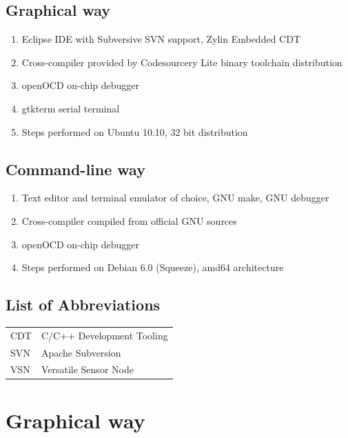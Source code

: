 \documentclass[a4paper, 10pt]{article}
\begin{document}
\subsection{Graphical way}

\begin{enumerate}
\item Eclipse IDE with Subversive SVN support, Zylin Embedded CDT
\item Cross-compiler provided by Codesourcery Lite binary toolchain
distribution
\item openOCD on-chip debugger
\item gtkterm serial terminal
\item Steps performed on Ubuntu 10.10, 32 bit distribution
\end{enumerate}

\subsection{Command-line way}

\begin{enumerate}
\item Text editor and terminal emulator of choice, GNU make, GNU debugger
\item Cross-compiler compiled from official GNU sources
\item openOCD on-chip debugger
\item Steps performed on Debian 6.0 (Squeeze), amd64 architecture
\end{enumerate}

\newpage

\tableofcontents
\newpage

\listoffigures
\newpage

\subsection*{List of Abbreviations}
	\begin{tabular}{ l l }
    CDT	    & C/C++ Development Tooling \\
    SVN     & Apache Subversion \\
    VSN     & Versatile Sensor Node \\
	\end{tabular}
\newpage


\section{Graphical way}
\end{document}
